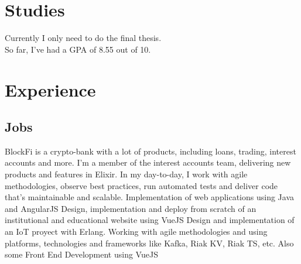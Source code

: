 \documentclass[11pt,a4paper,sans]{moderncv/moderncv} %
\begin{document}
\makecvtitle

\section{Studies}
{Currently I only need to do the final thesis.\\ So far, I've had a GPA of 8.55 out of 10.}  %

\section{Experience}
  \subsection{Jobs}
  { BlockFi is a crypto-bank with a lot of products, including loans, trading, interest accounts and more. I'm a member of the interest accounts team, delivering new products and features in Elixir. In my day-to-day, I work with agile methodologies, observe best practices, run automated tests and deliver code that's maintainable and scalable.
  }
  { Implementation of web applications using Java and AngularJS
  }
  {Design, implementation and deploy from scratch of an institutional and educational website using VueJS }
  {Design and implementation of an IoT proyect with Erlang. Working with agile methodologies and\newline
  {using platforms, technologies and frameworks like Kafka, Riak KV, Riak TS, etc. \newline Also some Front End Development using VueJS}
  }
\end{document}

